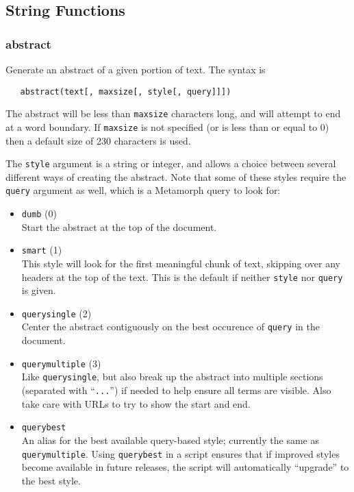 \subsection{String Functions}

\subsubsection{abstract}

Generate an abstract of a given portion of text.  The syntax is
\begin{verbatim}
   abstract(text[, maxsize[, style[, query]]])
\end{verbatim}

  The abstract will be less than \verb`maxsize` characters long, and
will attempt to end at a word boundary.  If \verb`maxsize` is not
specified (or is less than or equal to 0) then a default size of 230
characters is used.

  The \verb`style` argument is a string or integer, and allows a
choice between several different ways of creating the abstract.
Note that some of these styles require the \verb`query` argument as
well, which is a Metamorph query to look for:

\begin{itemize}
  \item \verb`dumb` (0) \\
    Start the abstract at the top of the document.

  \item \verb`smart` (1) \\
    This style will look for the first meaningful chunk of text,
    skipping over any headers at the top of the text.  This is the
    default if neither \verb`style` nor \verb`query` is given.

  \item \verb`querysingle` (2) \\
    Center the abstract contiguously on the best occurence of
    \verb`query` in the document.

  \item \verb`querymultiple` (3) \\
    Like \verb`querysingle`, but also break up the abstract into
    multiple sections (separated with ``\verb`...`'') if needed to
    help ensure all terms are visible.  Also take care with URLs to
    try to show the start and end.

  \item \verb`querybest` \\
    An alias for the best available query-based style; currently the
    same as \verb`querymultiple`.  Using \verb`querybest` in a script
    ensures that if improved styles become available in future
    releases, the script will automatically ``upgrade'' to the best
    style.
\end{itemize}

